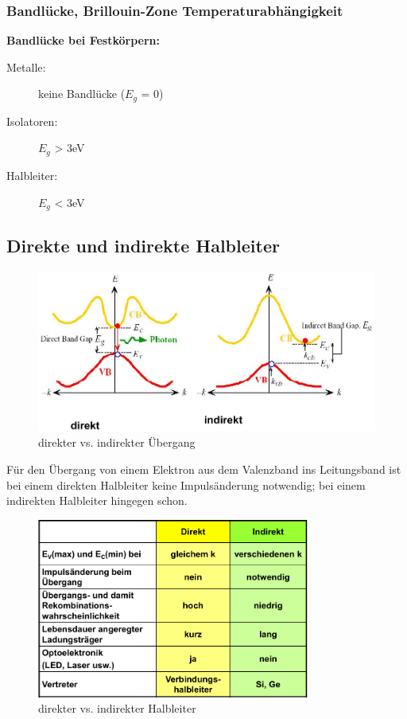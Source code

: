 	
	\subsubsection{Bandlücke, Brillouin-Zone
	Temperaturabhängigkeit}

		\textbf{Bandlücke bei Festkörpern:}
		\begin{description}
			\item[Metalle:] keine Bandlücke ($E_g$ = 0)
			\item[Isolatoren:] $E_g$ > 3eV
			\item[Halbleiter:] $E_g$ < 3eV
		\end{description}
		
		
\subsection{Direkte und indirekte Halbleiter}
	\begin{figure}[h!]
		\centering
		\includegraphics[width=\textwidth]{Kapitel/Kap03/uebergang_direkt_indirekt.png}
		\caption{direkter vs. indirekter Übergang}
		\label{02_uebergang}
	\end{figure}
	
	Für den Übergang von einem Elektron aus dem Valenzband ins Leitungsband ist bei einem direkten Halbleiter keine Impulsänderung notwendig; bei einem indirekten Halbleiter hingegen schon.
	
	\begin{figure}[h!]
		\centering
		\includegraphics[width=0.8\textwidth]{Kapitel/Kap03/direkt_indirekt.png}
		\caption{direkter vs. indirekter Halbleiter}
		\label{02_dir_ind_hl}
	\end{figure}
	
